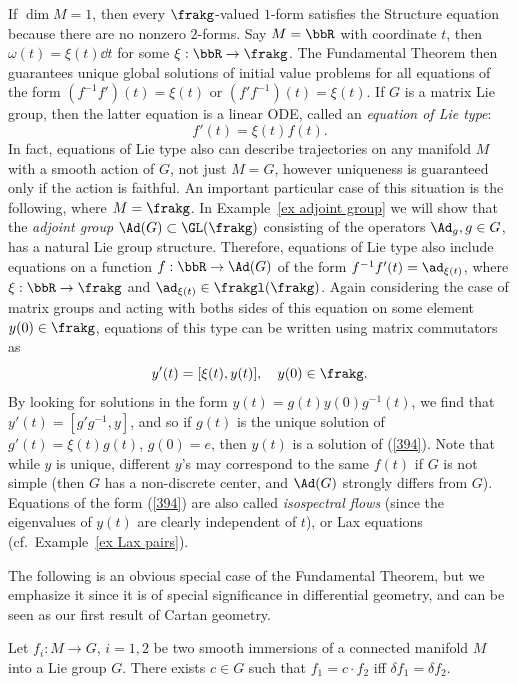 \begin{example}
    If $\dim M=1$, then every $\frakg$-valued $1$-form satisfies the Structure equation because there are no nonzero $2$-forms. Say $M=\bbR$ with coordinate $t$, then $\omega(t)=\xi(t)\dd t$ for some $\xi:\bbR\to \frakg$. The Fundamental Theorem then guarantees unique global solutions of initial value problems for all equations of the form $(f^{-1}f')(t)=\xi(t)$ or $(f'f^{-1})(t)=\xi(t)$. If $G$ is a matrix Lie group, then the latter equation is a linear ODE, called an \emph{equation of Lie type}:
    \[f'(t)=\xi(t)f(t).\]
    In fact, equations of Lie type also can describe trajectories on any manifold $M$ with a smooth action of $G$, not just $M=G$, however uniqueness is guaranteed only if the action is faithful. An important particular case of this situation is the following, where $M=\frakg$. In Example~\ref{ex adjoint group} we will show that the \emph{adjoint group} $\Ad(G)\subset \GL(\frakg)$ consisting of the operators $\Ad_g,g\in G$, has a natural Lie group structure. Therefore, equations of Lie type also include equations on a function $f:\bbR\to \Ad(G)$ of the form $f^{-1}f'(t)=\ad_{\xi(t)}$, where $\xi:\bbR\to \frakg$ and $\ad_{\xi(t)}\in \frakgl(\frakg)$. Again considering the case of matrix groups and acting with boths sides of this equation on some element $y(0)\in \frakg$, equations of this type can be written using matrix commutators as 
    \[y'(t)=[\xi(t),y(t)],\quad y(0)\in\frakg.\label{394}\]
    By looking for solutions in the form $y(t)=g(t)y(0)g^{-1}(t)$, we find that $y'(t)=[g'g^{-1},y]$, and so if $g(t)$ is the unique solution of $g'(t)=\xi(t)g(t)$, $g(0)=e$, then $y(t)$ is a solution of (\ref{394}). Note that while $y$ is unique, different $y$'s may correspond to the same $f(t)$ if $G$ is not simple (then $G$ has a non-discrete center, and $\Ad(G)$ strongly differs from $G$). Equations of the form (\ref{394}) are also called \emph{isospectral flows} (since the eigenvalues of $y(t)$ are clearly independent of $t$), or Lax equations (cf.\ Example~\ref{ex Lax pairs}).
\end{example}

The following is an obvious special case of the Fundamental Theorem, but we emphasize it since it is of special significance in differential geometry, and can be seen as our first result of Cartan geometry.

\begin{cor}\label{cor immersions into G}
    Let $f_i:M\to G$, $i=1,2$ be two smooth immersions of a connected manifold $M$ into a Lie group $G$. There exists $c\in G$ such that $f_1=c\cdot f_2$ iff $\delta f_1=\delta f_2$.
\end{cor}





